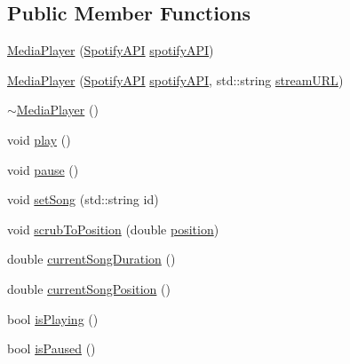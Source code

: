 \subsection*{Public Member Functions}
\begin{DoxyCompactItemize}
\item 
\mbox{\hyperlink{class_media_player_a7f93c5a1a991ed298828f93524ddfc2c}{Media\+Player}} (\mbox{\hyperlink{class_spotify_a_p_i}{Spotify\+A\+PI}} \mbox{\hyperlink{class_media_player_a1aa28d49d3a69b24d23e7564d00ecb89}{spotify\+A\+PI}})
\item 
\mbox{\hyperlink{class_media_player_a93f1f35c22c8195c6786d26f944eef51}{Media\+Player}} (\mbox{\hyperlink{class_spotify_a_p_i}{Spotify\+A\+PI}} \mbox{\hyperlink{class_media_player_a1aa28d49d3a69b24d23e7564d00ecb89}{spotify\+A\+PI}}, std\+::string \mbox{\hyperlink{class_media_player_ae236af5daf2a13066c3f21c4b4137ade}{stream\+U\+RL}})
\item 
\mbox{\hyperlink{class_media_player_accc0b8e6669a8ec0842aa906a9da1511}{$\sim$\+Media\+Player}} ()
\item 
void \mbox{\hyperlink{class_media_player_a64c608f3b47cafae19ec60c9435df099}{play}} ()
\item 
void \mbox{\hyperlink{class_media_player_a790f3b46f3961771fe67ce57591eb9d1}{pause}} ()
\item 
void \mbox{\hyperlink{class_media_player_a7c3d40399fc3b366a1f6324e8be1f4e5}{set\+Song}} (std\+::string id)
\item 
void \mbox{\hyperlink{class_media_player_a2d0b6e0f85f3f8a87d0ff8de04b44cc7}{scrub\+To\+Position}} (double \mbox{\hyperlink{class_media_player_a7fae8625cd922cc1059427d7c74d4fdf}{position}})
\item 
double \mbox{\hyperlink{class_media_player_a12c176a856cba35eff631cca707bd97b}{current\+Song\+Duration}} ()
\item 
double \mbox{\hyperlink{class_media_player_abe3dbd56c114f320b5bd3e293f55f246}{current\+Song\+Position}} ()
\item 
bool \mbox{\hyperlink{class_media_player_a1a0c1276e6c3d5954dc80a00787e8568}{is\+Playing}} ()
\item 
bool \mbox{\hyperlink{class_media_player_a435a05fd0a11295f8c9be09d7b82abe8}{is\+Paused}} ()
\end{DoxyCompactItemize}
